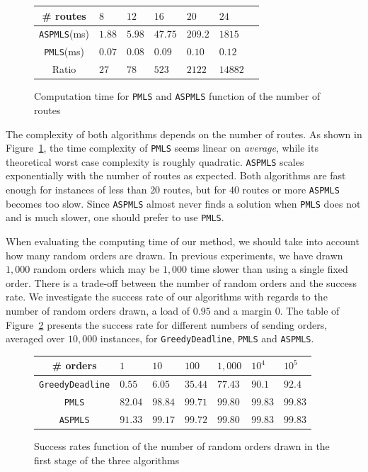 \documentclass[a4paper,10pt]{journal}
\newcommand\greedydeadline{\texttt{GreedyDeadline}\xspace}
\newcommand\PMLS{\texttt{PMLS}\xspace}
\newcommand\ASPMLS{\texttt{ASPMLS}\xspace}
\begin{document}
     
          \begin{figure}[h] 
       \begin{center}
   \begin{tabularx}{0.8\textwidth}{|c|X|X|X|X|X|X|}
    \hline
    \# routes& $8$ & $12$ & $16$& $20$ & $24$\\
    \hline
    \ASPMLS (ms) & $1.88$ &$5.98$&$47.75$&$209.2$&$1815$\\
    \hline
     \PMLS (ms) & $0.07$ &$0.08$&$0.09$&$0.10$&$0.12$\\
    \hline
    Ratio & $27$ &$78$&$523$&$2122$&$14882$\\
    \hline
      \end{tabularx}
      \end{center}
   \caption{Computation time for \PMLS and \ASPMLS function of the number of routes}
        \label{fig:tps_fpt}
     \end{figure}
    

  The complexity of both algorithms depends on the number of routes. As shown in Figure~\ref{fig:tps_fpt}, the time complexity of \PMLS seems linear on \emph{average}, while its theoretical worst case complexity is roughly quadratic. \ASPMLS scales exponentially with the number of routes as expected. Both algorithms are fast enough for instances of less than $20$ routes, but for $40$ routes or more \ASPMLS becomes too slow. Since \ASPMLS almost never finds a solution when \PMLS does not and is much slower, one should prefer to use \PMLS. 

    When evaluating the computing time of our method, we should take into account how many random orders are drawn. In previous experiments, we have drawn $1,000$ random orders which may be $1,000$ time slower than using a single fixed order. There is a trade-off between the number of random orders and the success rate. We investigate the success rate of our algorithms with regards to the number of random orders drawn, a load of $0.95$ and a margin $0$. The table of Figure~\ref{fig:randomdrawing} presents the success rate for different numbers of sending orders, averaged over $10,000$ instances, for \greedydeadline, \PMLS and \ASPMLS.


         \begin{figure}[h] 
       \begin{center}
   \begin{tabularx}{0.8\textwidth}{|c|X|X|X|X|X|X|}
    \hline
    \# orders& $1$ & $10$ & $100$& $1,000$& $10^{4}$&$10^{5}$\\
    \hline
    \greedydeadline & $0.55$ &$6.05$&$35.44$&$77.43$&$90.1$&$92.4$\\
    \hline
    \PMLS & $82.04$ &$98.84$&$99.71$&$99.80$&$99.83$&$99.83$\\
    \hline
    \ASPMLS & $91.33$&$99.17$&$99.72$&$99.80$ &$99.83$&$99.83$\\
    \hline
      \end{tabularx}
      \end{center}
   \caption{Success rates function of the number of random orders drawn in the first stage of the three algorithms}
        \label{fig:randomdrawing}
     \end{figure}
\end{document}
